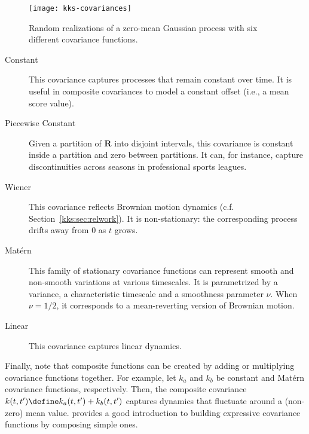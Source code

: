 \begin{figure}
	\centering
	\texttt{[image: kks-covariances]}
	\caption{Random realizations of a zero-mean Gaussian process with six different covariance functions.}
	\label{kks:fig:covariances}
\end{figure}

\begin{description}
	\item[Constant] This covariance captures processes that remain constant over time.
	      It is useful in composite covariances to model a constant offset (i.e., a mean score value).

	\item[Piecewise Constant]
	      Given a partition of $\mathbf{R}$ into disjoint intervals, this covariance is constant inside a partition and zero between partitions.
	      It can, for instance, capture discontinuities across seasons in professional sports leagues.

	\item[Wiener] This covariance reflects Brownian motion dynamics (c.f. Section~\ref{kks:sec:relwork}).
	      It is non-stationary: the corresponding process drifts away from $0$ as $t$ grows.

	\item[Matérn] This family of stationary covariance functions can represent smooth and non-smooth variations at various timescales.
	      It is parametrized by a variance, a characteristic timescale and a smoothness parameter $\nu$.
	      When $\nu = 1/2$, it corresponds to a mean-reverting version of Brownian motion.

	\item[Linear] This covariance captures linear dynamics.
\end{description}

Finally, note that composite functions can be created by adding or multiplying covariance functions together.
For example, let $k_a$ and $k_b$ be constant and Matérn covariance functions, respectively.
Then, the composite covariance $k(t, t') \define k_a(t, t') + k_b(t, t')$ captures dynamics that fluctuate around a (non-zero) mean value.
\citet[Section 2.3]{duvenaud2014automatic} provides a good introduction to building expressive covariance functions by composing simple ones.
